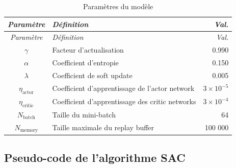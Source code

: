 \begin{longtable}{cp{11cm}r}

    \caption{Paramètres du modèle}
    \label{tab:model_parameters}                                                                  \\
    \toprule
    \textit{Paramètre}     & \textit{Définition}                             & \textit{Val.}      \\
    \midrule
    \endfirsthead
    \toprule
    \textit{Paramètre}     & \textit{Définition}                             & \textit{Val.}      \\
    \midrule
    \endhead
    \midrule
    \endfoot
    \bottomrule
    \endlastfoot

    $\gamma$               & Facteur d'actualisation                         & 0.990              \\
    $\alpha$               & Coefficient d'entropie                          & 0.150              \\
    $\lambda$              & Coefficient de soft update                      & 0.005              \\
    \midrule
    $\eta_{\text{actor}}$  & Coefficient d'apprentissage de l'actor network  & $3 \times 10^{-5}$ \\
    $\eta_{\text{critic}}$ & Coefficient d'apprentissage des critic networks & $3 \times 10^{-4}$ \\
    \midrule
    $N_{\text{batch}}$     & Taille du mini-batch                            & 64                 \\
    $N_{\text{memory}}$    & Taille maximale du replay buffer                & 100 000            \\
\end{longtable}



\subsection{Pseudo-code de l'algorithme SAC}

